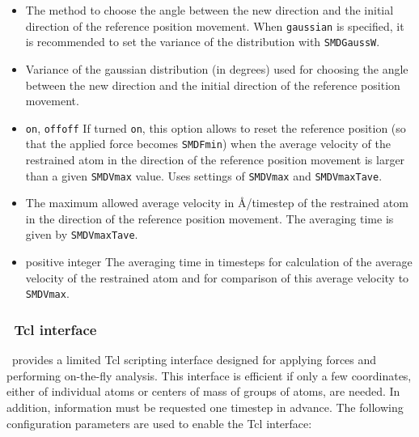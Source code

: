 \begin{itemize}
\item
{}
{The method to choose the angle between the new direction and the
initial direction of the reference position movement. When
\verb!gaussian! is specified, it is recommended to set the variance of
the distribution with \verb!SMDGaussW!.}

\item
{}
{Variance of the gaussian distribution (in degrees) used
for choosing the angle between the new direction and the
initial direction of the reference position movement.}


\item
{}
{\verb!on!, \verb!off!}{\verb!off!}
{If turned \verb!on!, this option allows to reset
the reference position (so that the applied force becomes
\verb!SMDFmin!) when the average velocity of the
restrained atom in the direction of the reference position movement is
larger than a given \verb!SMDVmax! value. Uses settings of 
\verb!SMDVmax! and \verb!SMDVmaxTave!.}

\item
{} {The maximum allowed average velocity in
\AA/timestep of the restrained atom in the direction of the reference
position movement. The averaging time is given by \verb!SMDVmaxTave!.}

\item
{}
{positive integer} {The averaging time in timesteps for calculation of
the average velocity of the restrained atom and for comparison of this
average velocity to
\verb!SMDVmax!.}
\end{itemize}

\subsubsection{\NAMD\ Tcl interface}

\NAMD\ provides a limited Tcl scripting interface designed for applying forces and performing on-the-fly analysis.
This interface is efficient if only a few coordinates, either of individual atoms or centers of mass of groups of atoms, are needed.
In addition, information must be requested one timestep in advance.
The following configuration parameters are used to enable the Tcl interface:

